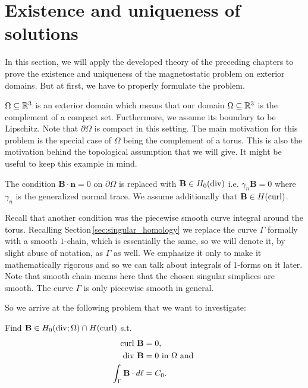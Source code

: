 \documentclass[../master_thesis.tex]{subfiles}
\begin{document}
\section{Existence and uniqueness of solutions}\label{sec:existence_and_uniqueness}

In this section, we will apply the developed theory of the preceding chapters
to prove the existence and uniqueness of the magnetostatic problem 
on exterior domains. But at first, we have to properly formulate the problem.

$\Omega \subseteq \mathbb{R}^3$ is an exterior domain which means 
that our domain $\Omega \subseteq \mathbb{R}^3$
is the complement of a compact set. Furthermore, we assume its boundary to be 
Lipschitz. Note that $\partial \Omega$ is compact in this setting.
The main motivation for this problem is 
the special case of $\Omega$ being the complement of a torus. 
This is also the motivation behind the
topological assumption that we will give. It might be useful to keep this
example in mind.

The condition $\mathbf{B}\cdot \mathbf{n} = 0$ on $\partial\Omega$ is replaced
with $\mathbf{B} \in H_0(\operatorname{div})$ i.e. $\gamma_n\mathbf{B} = 0$ where 
$\gamma_n$ is the generalized normal trace. We assume additionally that 
$\mathbf{B} \in H(\operatorname{curl})$. 

Recall that another condition was the piecewise smooth curve integral around the torus.
Recalling Section\,\ref{sec:singular_homology} we replace the curve $\Gamma$
formally with a smooth $1$-chain, which is essentially the same, so we will 
denote it, by slight abuse of notation, as $\Gamma$ as well. We emphasize 
it only to make it mathematically rigorous and so we can talk about integrals 
of $1$-forms on it later. Note that smooth chain means here that the chosen 
singular simplices are smooth. The curve $\Gamma$ is only piecewise smooth in 
general.

So we arrive at the following problem that we want to investigate:
\begin{problem}\label{prob:magnetostatic_problem}
    Find $\mathbf{B} \in H_0(\operatorname{div};\Omega) \cap H(\operatorname{curl})$ s.t.
    \begin{align}
        \operatorname{curl} \, \mathbf{B} &= 0, \\ 
        \operatorname{div} \, \mathbf{B}  &= 0 \text{ in } \Omega \text{ and }\\
        \int_\Gamma \mathbf{B} \cdot d\ell &= C_0.
    \end{align}
\end{problem}
\end{document}
